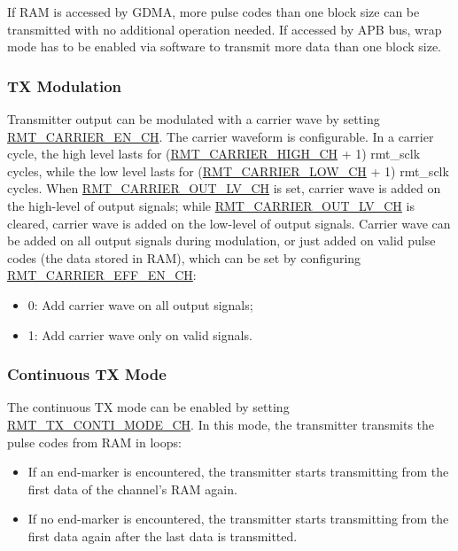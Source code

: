 \documentclass[main\_\_EN.tex]{subfiles}
\begin{document}
\begin{tiplisting}
If RAM is accessed by GDMA, more pulse codes than one block size can be transmitted with no additional operation needed. If accessed by APB bus, wrap mode has to be enabled via software to transmit more data than one block size.
\end{tiplisting}

\subsubsection{TX Modulation}

Transmitter output can be modulated with a carrier wave by setting \hyperref[fielddesc:RMTCARRIERENCHN]{RMT\_CARRIER\_EN\_CH}. The carrier waveform is configurable. In a carrier cycle, the high level lasts for (\hyperref[fielddesc:RMTCARRIERHIGHCHN]{RMT\_CARRIER\_HIGH\_CH} + 1) rmt\_sclk cycles, while the low level lasts for (\hyperref[fielddesc:RMTCARRIERLOWCHN]{RMT\_CARRIER\_LOW\_CH} + 1) rmt\_sclk cycles. When  \hyperref[fielddesc:RMTCARRIEROUTLVCHN]{RMT\_CARRIER\_OUT\_LV\_CH} is set, carrier wave is added on the high-level of output signals; while \hyperref[fielddesc:RMTCARRIEROUTLVCHN]{RMT\_CARRIER\_OUT\_LV\_CH} is cleared, carrier wave is added on the low-level of output signals. Carrier wave can be added on all output signals during modulation, or just added on valid pulse codes (the data stored in RAM), which can be set by configuring  \hyperref[fielddesc:RMTCARRIEREFFENCHN]{RMT\_CARRIER\_EFF\_EN\_CH}:
\begin{itemize}
    \item 0: Add carrier wave on all output signals;
    \item 1: Add carrier wave only on valid signals.
\end{itemize}

\subsubsection{Continuous TX Mode}


The continuous TX mode can be enabled by setting \hyperref[fielddesc:RMTTXCONTIMODECHN]{RMT\_TX\_CONTI\_MODE\_CH}. In this mode, the transmitter transmits the pulse codes from RAM in loops:
\begin{itemize}
    \item If an end-marker is encountered, the transmitter starts transmitting from the first data of the channel's RAM again.
    \item If no end-marker is encountered, the transmitter starts transmitting from the first data again after the last data is transmitted.
\end{itemize}
\end{document}
